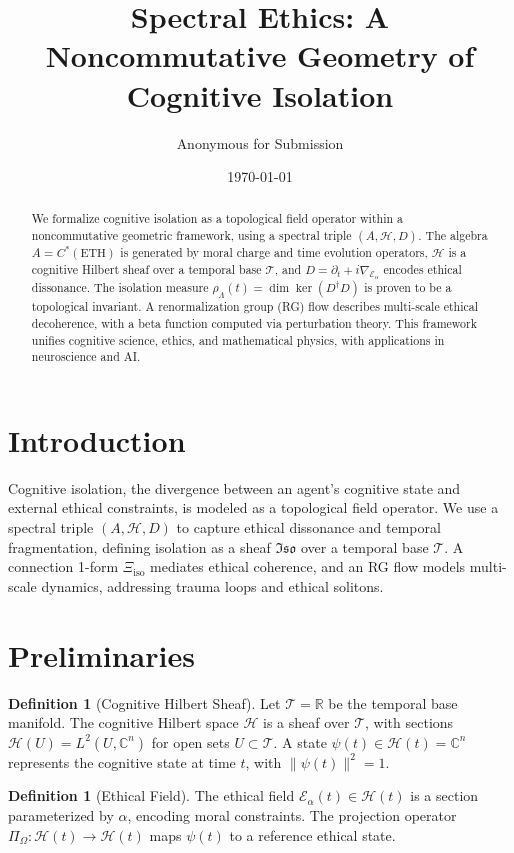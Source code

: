\documentclass[12pt]{article}
\title{Spectral Ethics: A Noncommutative Geometry of Cognitive Isolation}
\author{Anonymous for Submission}
\date{\today}
\theoremstyle{plain}
\theoremstyle{definition}
\newtheorem{definition}[theorem]{Definition}
\theoremstyle{remark}
\newcommand{\Hil}{\mathcal{H}}
\newcommand{\Eth}{\mathcal{E}_\alpha}
\newcommand{\Iso}{\mathfrak{Iso}}
\newcommand{\Tbase}{\mathcal{T}}
\newcommand{\rhol}{\rho_\Lambda}
\newcommand{\Xiso}{\Xi_{\text{iso}}}
\newcommand{\pii}{\Pi_\Omega}
\begin{document}
\maketitle

\begin{abstract}
We formalize cognitive isolation as a topological field operator within a noncommutative geometric framework, using a spectral triple $(A, \Hil, D)$. The algebra $A = C^*(\text{ETH})$ is generated by moral charge and time evolution operators, $\Hil$ is a cognitive Hilbert sheaf over a temporal base $\Tbase$, and $D = \partial_t + i \nabla_{\Eth}$ encodes ethical dissonance. The isolation measure $\rhol(t) = \dim \ker(D^\dagger D)$ is proven to be a topological invariant. A renormalization group (RG) flow describes multi-scale ethical decoherence, with a beta function computed via perturbation theory. This framework unifies cognitive science, ethics, and mathematical physics, with applications in neuroscience and AI.
\end{abstract}

\section{Introduction}
Cognitive isolation, the divergence between an agent's cognitive state and external ethical constraints, is modeled as a topological field operator. We use a spectral triple $(A, \Hil, D)$ to capture ethical dissonance and temporal fragmentation, defining isolation as a sheaf $\Iso$ over a temporal base $\Tbase$. A connection 1-form $\Xiso$ mediates ethical coherence, and an RG flow models multi-scale dynamics, addressing trauma loops and ethical solitons.

\section{Preliminaries}
\begin{definition}[Cognitive Hilbert Sheaf]
Let $\Tbase = \mathbb{R}$ be the temporal base manifold. The cognitive Hilbert space $\Hil$ is a sheaf over $\Tbase$, with sections $\Hil(U) = L^2(U, \mathbb{C}^n)$ for open sets $U \subset \Tbase$. A state $\psi(t) \in \Hil(t) = \mathbb{C}^n$ represents the cognitive state at time $t$, with $\|\psi(t)\|^2 = 1$.
\end{definition}

\begin{definition}[Ethical Field]
The ethical field $\Eth(t) \in \Hil(t)$ is a section parameterized by $\alpha$, encoding moral constraints. The projection operator $\pii: \Hil(t) \to \Hil(t)$ maps $\psi(t)$ to a reference ethical state.
\end{definition}
\end{document}
